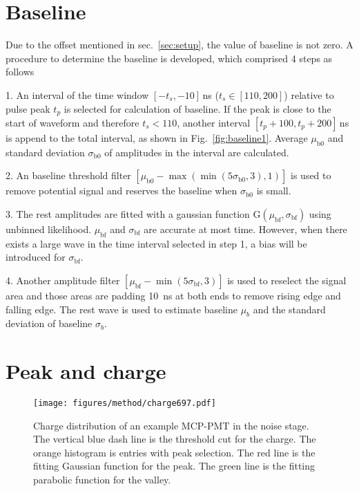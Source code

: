 \section{Baseline}
Due to the offset mentioned in sec.~\ref{sec:setup}, the value of baseline is not zero. A procedure to determine the baseline is developed, which comprised 4 steps as follows

1. An interval of the time window $[-t_s,-10]$\,ns ($t_s\in[110,200]$) relative to pulse peak $t_p$ is selected for calculation of baseline. If the peak is close to the start of waveform and therefore $t_s < 110$, another interval $[t_p+100,t_p+200]$\,ns is append to the total interval, as shown in Fig.~\ref{fig:baseline1}. Average $\mu_{\mathrm{b0}}$ and standard deviation $\sigma_{\mathrm{b0}}$ of amplitudes in the interval are calculated.

2. An baseline threshold filter $[\mu_{\mathrm{b0}}-\max(\min(5\sigma_{\mathrm{b0}},3),1)]$ is used to remove potential signal and reserves the baseline when $\sigma_{\mathrm{b0}}$ is small.

3. The rest amplitudes are fitted with a gaussian function G$(\mu_{\mathrm{bf}},\sigma_{\mathrm{bf}})$ using unbinned likelihood.
 $\mu_{\mathrm{bf}}$ and $\sigma_{\mathrm{bf}}$ are accurate at most time. However, when there exists a large wave in the time interval selected in step 1, a bias will be introduced for $\sigma_{\mathrm{bf}}$.

4. Another amplitude filter $[\mu_{\mathrm{bf}}-\min(5\sigma_{\mathrm{bf}},3)]$ is used to reselect the signal area and those areas are padding \SI{10}{ns} at both ends to remove rising edge and falling edge. The rest wave is used to estimate baseline $\mu_b$ and the standard deviation of baseline $\sigma_b$.

\section{Peak and charge}
\begin{figure}[!htbp]
    \centering
    \texttt{[image: figures/method/charge697.pdf]}
    \caption{Charge distribution of an example MCP-PMT in the noise stage. The vertical blue dash line is the threshold cut for the charge. The orange histogram is entries with peak selection. The red line is the fitting Gaussian function for the peak. The green line is the fitting parabolic function for the valley.}
    \label{fig:charge}
\end{figure}

